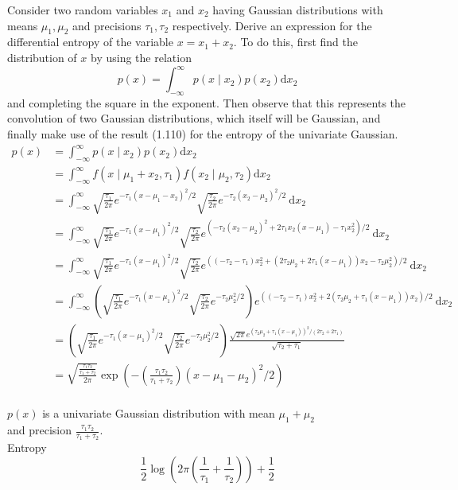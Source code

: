 \documentclass{article}
\begin{document}
Consider two random variables $x_{1}$ and $x_{2}$ having Gaussian distributions with means $\mu_{1}, \mu_{2}$ and precisions $\tau_{1}, \tau_{2}$ respectively. Derive an expression for the differential entropy of the variable $x=x_{1}+x_{2}$. To do this, first find the distribution of $x$ by using the relation
$$
p(x)=\int_{-\infty}^{\infty} p\left(x \mid x_{2}\right) p\left(x_{2}\right) \mathrm{d} x_{2}
$$
and completing the square in the exponent. Then observe that this represents the convolution of two Gaussian distributions, which itself will be Gaussian, and finally make use of the result (1.110) for the entropy of the univariate Gaussian.
$$\begin{aligned} p(x) &=\int_{-\infty}^{\infty} p\left(x \mid x_{2}\right) p\left(x_{2}\right) \mathrm{d} x_{2} \\ &=\int_{-\infty}^{\infty} f\left(x \mid \mu_{1}+x_{2}, \tau_{1}\right) f\left(x_{2} \mid \mu_{2}, \tau_{2}\right) \mathrm{d} x_{2} \\ &=\int_{-\infty}^{\infty} \sqrt{\frac{\tau_{1}}{2 \pi}} e^{-\tau_{1}\left(x-\mu_{1}-x_{2}\right)^{2} / 2} \sqrt{\frac{\tau_{2}}{2 \pi}} e^{-\tau_{2}\left(x_{2}-\mu_{2}\right)^{2} / 2} \mathrm{~d} x_{2}\\&=\int_{-\infty}^{\infty} \sqrt{\frac{\tau_{1}}{2 \pi}} e^{-\tau_{1}\left(x-\mu_{1}\right)^{2} / 2} \sqrt{\frac{\tau_{2}}{2 \pi}} e^{\left(-\tau_{2}\left(x_{2}-\mu_{2}\right)^{2}+2 \tau_{1} x_{2}\left(x-\mu_{1}\right)-\tau_{1} x_{2}^{2}\right) / 2} \mathrm{~d} x_{2} \\
&=\int_{-\infty}^{\infty} \sqrt{\frac{\tau_{1}}{2 \pi}} e^{-\tau_{1}\left(x-\mu_{1}\right)^{2} / 2} \sqrt{\frac{\tau_{2}}{2 \pi}} e^{\left(\left(-\tau_{2}-\tau_{1}\right) x_{2}^{2}+\left(2 \tau_{2} \mu_{2}+2 \tau_{1}\left(x-\mu_{1}\right)\right) x_{2}-\tau_{2} \mu_{2}^{2}\right) / 2} \mathrm{~d} x_{2} \\
&=\int_{-\infty}^{\infty}\left(\sqrt{\frac{\tau_{1}}{2 \pi}} e^{-\tau_{1}\left(x-\mu_{1}\right)^{2} / 2} \sqrt{\frac{\tau_{2}}{2 \pi}} e^{-\tau_{2} \mu_{2}^{2} / 2}\right) e^{\left(\left(-\tau_{2}-\tau_{1}\right) x_{2}^{2}+2\left(\tau_{2} \mu_{2}+\tau_{1}\left(x-\mu_{1}\right)\right) x_{2}\right) / 2} \mathrm{~d} x_{2}\\
&=\left(\sqrt{\frac{\tau_{1}}{2 \pi}} e^{-\tau_{1}\left(x-\mu_{1}\right)^{2} / 2} \sqrt{\frac{\tau_{2}}{2 \pi}} e^{-\tau_{2} \mu_{2}^{2} / 2}\right) \frac{\sqrt{2 \pi} e^{\left(\tau_{2} \mu_{2}+\tau_{1}\left(x-\mu_{1}\right)\right)^{2} /\left(2 \tau_{2}+2 \tau_{1}\right)}}{\sqrt{\tau_{2}+\tau_{1}}} \\
&=\sqrt{\frac{\frac{\tau_{1} \tau_{2}}{\tau_{1}+\tau_{2}}}{2 \pi}} \exp \left(-\left(\frac{\tau_{1} \tau_{2}}{\tau_{1}+\tau_{2}}\right)\left(x-\mu_{1}-\mu_{2}\right)^{2} / 2\right)\end{aligned}$$
\\$p(x)$ is a univariate Gaussian distribution with mean $\mu_{1}+\mu_{2}$ \\ and precision $\frac{\tau_{1} \tau_{2}}{\tau_{1}+\tau_{2}}$. \\ Entropy
$$
\frac{1}{2} \log \left(2 \pi\left(\frac{1}{\tau_{1}}+\frac{1}{\tau_{2}}\right)\right)+\frac{1}{2}
$$
\end{document}
